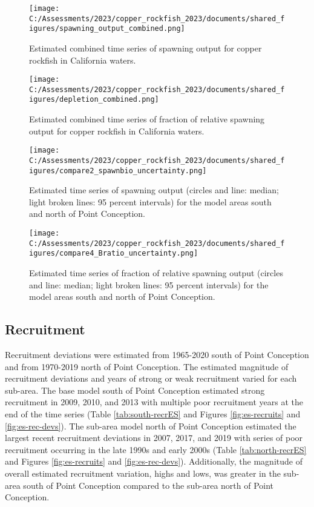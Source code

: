 \documentclass[11pt,
  english,
  letterpaper,
]{article}
\begin{document}
\begin{figure}
\centering
\texttt{[image: C:/Assessments/2023/copper\_rockfish\_2023/documents/shared\_figures/spawning\_output\_combined.png]}
\caption{Estimated combined time series of spawning output for copper rockfish in California waters.\label{fig:es-sb-all}}
\end{figure}

\begin{figure}
\centering
\texttt{[image: C:/Assessments/2023/copper\_rockfish\_2023/documents/shared\_figures/depletion\_combined.png]}
\caption{Estimated combined time series of fraction of relative spawning output for copper rockfish in California waters.\label{fig:es-depl-all}}
\end{figure}

\begin{figure}
\centering
\texttt{[image: C:/Assessments/2023/copper\_rockfish\_2023/documents/shared\_figures/compare2\_spawnbio\_uncertainty.png]}
\caption{Estimated time series of spawning output (circles and line: median; light broken lines: 95 percent intervals) for the model areas south and north of Point Conception.\label{fig:es-sb}}
\end{figure}

\begin{figure}
\centering
\texttt{[image: C:/Assessments/2023/copper\_rockfish\_2023/documents/shared\_figures/compare4\_Bratio\_uncertainty.png]}
\caption{Estimated time series of fraction of relative spawning output (circles and line: median; light broken lines: 95 percent intervals) for the model areas south and north of Point Conception.\label{fig:es-depl}}
\end{figure}

\pagebreak

\hypertarget{recruitment}{%
\subsection*{Recruitment}\label{recruitment}}

Recruitment deviations were estimated from 1965-2020 south of Point Conception and from 1970-2019 north of Point Conception. The estimated magnitude of recruitment deviations and years of strong or weak recruitment varied for each sub-area. The base model south of Point Conception estimated strong recruitment in 2009, 2010, and 2013 with multiple poor recruitment years at the end of the time series (Table \ref{tab:south-recrES} and Figures \ref{fig:es-recruits} and \ref{fig:es-rec-devs}). The sub-area model north of Point Conception estimated the largest recent recruitment deviations in 2007, 2017, and 2019 with series of poor recruitment occurring in the late 1990s and early 2000s (Table \ref{tab:north-recrES} and Figures \ref{fig:es-recruits} and \ref{fig:es-rec-devs}). Additionally, the magnitude of overall estimated recruitment variation, highs and lows, was greater in the sub-area south of Point Conception compared to the sub-area north of Point Conception.
\end{document}
